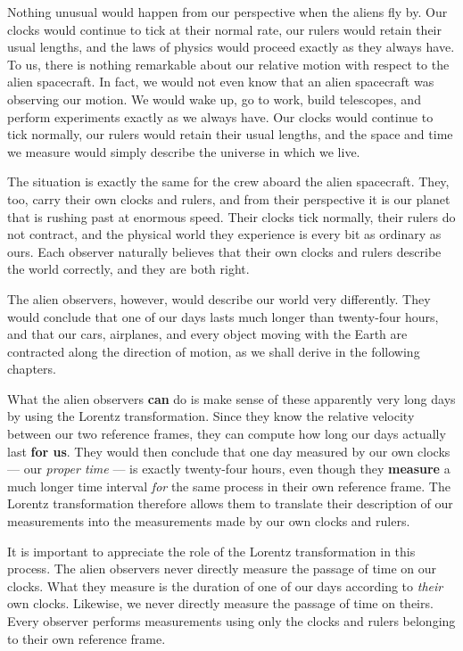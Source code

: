 \documentclass[12pt]{article}
\begin{document}
Nothing unusual would happen from our perspective when the aliens fly by. Our
clocks would continue to tick at their normal rate, our rulers would retain
their usual lengths, and the laws of physics would proceed exactly as they
always have. To us, there is nothing remarkable about our relative motion with
respect to the alien spacecraft. In fact, we would not even know that an alien
spacecraft was observing our motion. We would wake up, go to work,
build telescopes, and perform experiments exactly as we always have. Our clocks
would continue to tick normally, our rulers would retain their usual lengths,
and the space and time we measure would simply describe the universe in which
we live.\par

The situation is exactly the same for the crew aboard the alien spacecraft.
They, too, carry their own clocks and rulers, and from their perspective it is
our planet that is rushing past at enormous speed. Their clocks tick normally,
their rulers do not contract, and the physical world they experience is every
bit as ordinary as ours. Each observer naturally believes that their own clocks
and rulers describe the world correctly, and they are both right.\par

The alien observers, however, would describe our world very differently. They
would conclude that one of our days lasts much longer than twenty-four hours,
and that our cars, airplanes, and every object moving with the Earth are
contracted along the direction of motion, as we shall derive in the following
chapters.\par

What the alien observers \textbf{can} do is make sense of these apparently very
long days by using the Lorentz transformation. Since they know the relative
velocity between our two reference frames, they can compute how long our days
actually last \textbf{for us}. They would then conclude that one day measured by
our own clocks --- our \emph{proper time} --- is exactly twenty-four hours, even though they \textbf{measure} a much longer time interval
\emph{for} the same process in their own reference frame. The Lorentz transformation therefore allows them to translate
their description of our measurements into the measurements made by our own
clocks and rulers. \par

It is important to appreciate the role of the Lorentz transformation in this
process. The alien observers never directly measure the passage of time on our
clocks. What they measure is the duration of one of our days according to
\emph{their} own clocks. Likewise, we never directly measure the passage of
time on theirs. Every observer performs measurements using only the clocks and
rulers belonging to their own reference frame.
\end{document}
